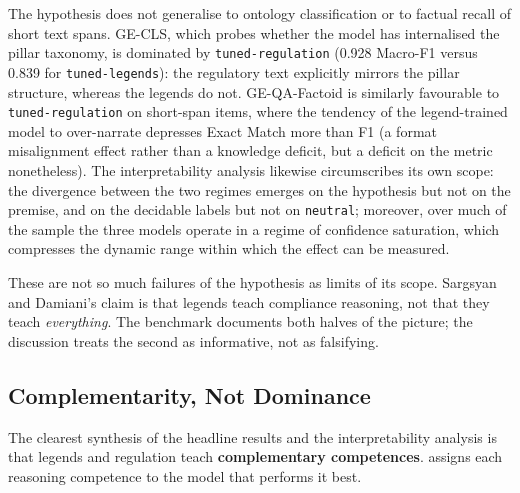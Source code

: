 \documentclass[pdflatex, sn-apa]{sn-jnl}%
\theoremstyle{thmstyleone}%
\theoremstyle{thmstyletwo}%
\theoremstyle{thmstylethree}%
\newcommand{\modellegends}{\texttt{tuned-legends}}
\newcommand{\modelreg}{\texttt{tuned-regulation}}
\begin{document}
The hypothesis does not generalise to ontology classification or to factual
recall of short text spans. GE-CLS, which probes whether the model has
internalised the pillar taxonomy, is dominated by \modelreg{} (0.928 Macro-F1
versus 0.839 for \modellegends): the regulatory text explicitly mirrors the
pillar structure, whereas the legends do not. GE-QA-Factoid is similarly
favourable to \modelreg{} on short-span items, where the tendency of the
legend-trained model to over-narrate depresses Exact Match more than F1 (a format
misalignment effect rather than a knowledge deficit, but a deficit on the metric
nonetheless). The interpretability analysis likewise circumscribes its own scope:
the divergence between the two regimes emerges on the hypothesis but not on the
premise, and on the decidable labels but not on \texttt{neutral}; moreover, over
much of the sample the three models operate in a regime of confidence saturation,
which compresses the dynamic range within which the effect can be measured.

These are not so much failures of the hypothesis as limits of its scope. Sargsyan
and Damiani's claim is that legends teach compliance reasoning, not that they
teach \emph{everything}. The benchmark documents both halves of the picture; the
discussion treats the second as informative, not as falsifying.

\subsection{Complementarity, Not Dominance}
\label{sec:disc:complementarity}

The clearest synthesis of the headline results and the interpretability analysis
is that legends and regulation teach \textbf{complementary competences}.
 assigns each reasoning competence to the model that
performs it best.
\end{document}
